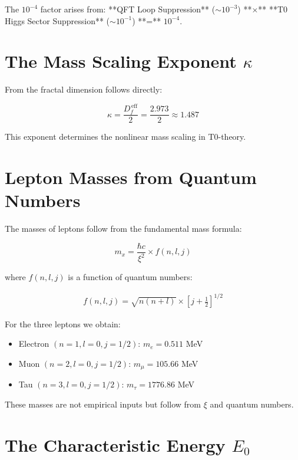 The $10^{-4}$ factor arises from: **QFT Loop Suppression** ($\sim 10^{-3}$) **×** **T0 Higgs Sector Suppression** ($\sim 10^{-1}$) **=** $10^{-4}$.

	\section{The Mass Scaling Exponent $\kappa$}
	
	From the fractal dimension follows directly:
	
	\begin{equation}
		\kappa = \frac{D_f^{\,\text{eff}}}{2} = \frac{2.973}{2} \approx 1.487
	\end{equation}
	
	This exponent determines the nonlinear mass scaling in T0-theory.
	
	\section{Lepton Masses from Quantum Numbers}
	
	The masses of leptons follow from the fundamental mass formula:
	
	\begin{equation}
		m_x = \frac{\hbar c}{\xi^2} \times f(n, l, j)
	\end{equation}
	
	where $f(n, l, j)$ is a function of quantum numbers:
	
	\begin{align}
		f(n, l, j) = \sqrt{n(n+l)} \times \left[j + \frac{1}{2}\right]^{1/2}
	\end{align}
	
	For the three leptons we obtain:
	
	\begin{itemize}
		\item Electron $(n=1, l=0, j=1/2)$: $m_e = 0.511$ MeV
		\item Muon $(n=2, l=0, j=1/2)$: $m_\mu = 105.66$ MeV
		\item Tau $(n=3, l=0, j=1/2)$: $m_\tau = 1776.86$ MeV
	\end{itemize}
	
	These masses are not empirical inputs but follow from $\xi$ and quantum numbers.
	
	\section{The Characteristic Energy $E_0$}
	
